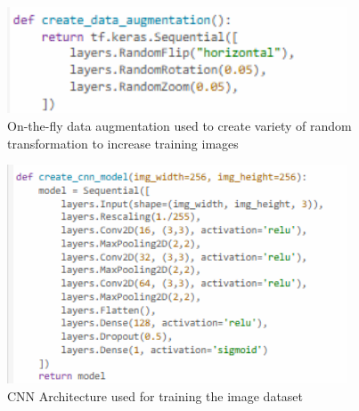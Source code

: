 \begin{figure}[!htbp]
	\centering
	\includegraphics[width=0.9\textwidth, angle=0]{figures/live_augmentation.png}
	\caption{On-the-fly data augmentation used to create variety of random transformation to increase training images}
\end{figure}

\begin{figure}[!htbp]
	\centering
	\includegraphics[width=0.9\textwidth, angle=0]{figures/CNN_layers.png}
	\caption{CNN Architecture used for training the image dataset}
\end{figure}
